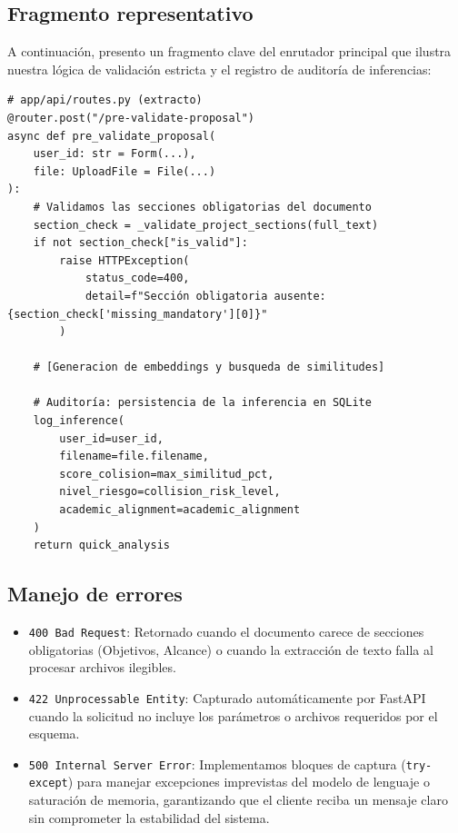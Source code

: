 \subsection{Fragmento representativo}

A continuación, presento un fragmento clave del enrutador principal que ilustra nuestra lógica de validación estricta y el registro de auditoría de inferencias:

\begin{lstlisting}[style=pythonstyle]
# app/api/routes.py (extracto)
@router.post("/pre-validate-proposal")
async def pre_validate_proposal(
    user_id: str = Form(...),
    file: UploadFile = File(...)
):
    # Validamos las secciones obligatorias del documento
    section_check = _validate_project_sections(full_text)
    if not section_check["is_valid"]:
        raise HTTPException(
            status_code=400,
            detail=f"Sección obligatoria ausente: {section_check['missing_mandatory'][0]}"
        )
    
    # [Generacion de embeddings y busqueda de similitudes]
    
    # Auditoría: persistencia de la inferencia en SQLite
    log_inference(
        user_id=user_id,
        filename=file.filename,
        score_colision=max_similitud_pct,
        nivel_riesgo=collision_risk_level,
        academic_alignment=academic_alignment
    )
    return quick_analysis
\end{lstlisting}

\subsection{Manejo de errores}

\begin{itemize}
  \item \texttt{400 Bad Request}: Retornado cuando el documento carece de secciones obligatorias (Objetivos, Alcance) o cuando la extracción de texto falla al procesar archivos ilegibles.
  \item \texttt{422 Unprocessable Entity}: Capturado automáticamente por FastAPI cuando la solicitud no incluye los parámetros o archivos requeridos por el esquema.
  \item \texttt{500 Internal Server Error}: Implementamos bloques de captura (\texttt{try-except}) para manejar excepciones imprevistas del modelo de lenguaje o saturación de memoria, garantizando que el cliente reciba un mensaje claro sin comprometer la estabilidad del sistema.
\end{itemize}

